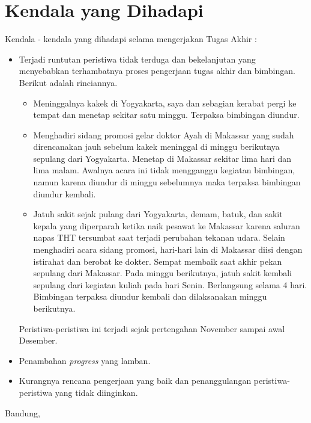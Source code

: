 \documentclass[a4paper,twoside]{article}
\begin{document}
	\section{Kendala yang Dihadapi}
	Kendala - kendala yang dihadapi selama mengerjakan Tugas Akhir :
	\begin{itemize}
		\item Terjadi runtutan peristiwa tidak terduga dan bekelanjutan yang menyebabkan terhambatnya proses pengerjaan tugas akhir dan bimbingan. Berikut adalah rinciannya.
		\begin{itemize}
			\item Meninggalnya kakek di Yogyakarta, saya dan sebagian kerabat pergi ke tempat dan menetap sekitar satu minggu. Terpaksa bimbingan diundur.
			\item Menghadiri sidang promosi gelar doktor Ayah di Makassar yang sudah direncanakan jauh sebelum kakek meninggal di minggu berikutnya sepulang dari Yogyakarta. Menetap di Makassar sekitar lima hari dan lima malam. Awalnya acara ini tidak mengganggu kegiatan bimbingan, namun karena diundur di minggu sebelumnya maka terpaksa bimbingan diundur kembali.
			\item Jatuh sakit sejak pulang dari Yogyakarta, demam, batuk, dan sakit kepala yang diperparah ketika naik pesawat ke Makassar karena saluran napas THT tersumbat saat terjadi perubahan tekanan udara. Selain menghadiri acara sidang promosi, hari-hari lain di Makassar diisi dengan istirahat dan berobat ke dokter. Sempat membaik saat akhir pekan sepulang dari Makassar. Pada minggu berikutnya, jatuh sakit kembali sepulang dari kegiatan kuliah pada hari Senin. Berlangsung selama 4 hari. Bimbingan terpaksa diundur kembali dan dilaksanakan minggu berikutnya.
		\end{itemize} 
		Peristiwa-peristiwa ini terjadi sejak pertengahan November sampai awal Desember. 
		\item Penambahan \textit{progress} yang lamban. 
		\item Kurangnya rencana pengerjaan yang baik dan penanggulangan peristiwa-peristiwa yang tidak diinginkan. 
	\end{itemize}
		
		
		\vspace{1cm}
		\centering Bandung, \tanggal\\
		\vspace{2cm} \nama \\ 
		\vspace{1cm}
		
\end{document}
